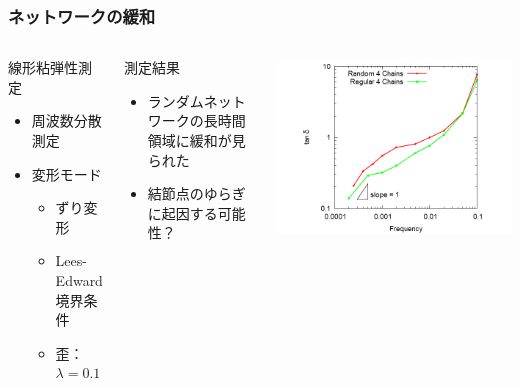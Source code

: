 \documentclass[11pt, dvipdfmx]{beamer}
\begin{document}
\begin{frame}
\frametitle{ネットワークの緩和}

\begin{columns}[totalwidth=\linewidth]

\begin{block}{線形粘弾性測定}
	\begin{itemize}
	\item
	周波数分散測定
	\item
	変形モード
		\begin{itemize}
		\item
		ずり変形
		\item
		Lees-Edward 境界条件
		\item
		歪：$\lambda = 0.1$
		\end{itemize}
	\end{itemize}
\end{block}

\begin{exampleblock}{測定結果}
	\begin{itemize}
	\item
	ランダムネットワークの長時間領域に緩和が見られた
	\item
	結節点のゆらぎに起因する可能性？
	\end{itemize}
\end{exampleblock}

\includegraphics[width=1.3\columnwidth]{./fig/Freq_sweep_tand.png}

\end{columns}

\end{frame}
\end{document}
